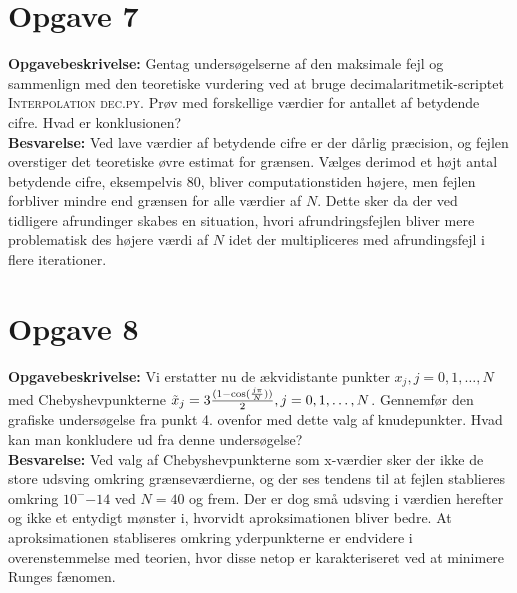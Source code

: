 \section*{Opgave 7}
\textbf{Opgavebeskrivelse:} Gentag undersøgelserne af den maksimale fejl og sammenlign med den teoretiske vurdering ved at bruge decimalaritmetik-scriptet \textsc{Interpolation dec.py}. 
Prøv med forskellige værdier for antallet af betydende cifre. 
Hvad er konklusionen?
\\
\textbf{Besvarelse:} 
Ved lave værdier af betydende cifre er der dårlig præcision, og fejlen overstiger det teoretiske øvre estimat for grænsen. 
Vælges derimod et højt antal betydende cifre, eksempelvis $80$, bliver computationstiden højere, men fejlen forbliver mindre end grænsen for alle værdier af $N$.
Dette sker da der ved tidligere afrundinger skabes en situation, hvori afrundringsfejlen bliver mere problematisk des højere værdi af $N$ idet der multipliceres med afrundingsfejl i flere iterationer.
\section*{Opgave 8}
\textbf{Opgavebeskrivelse:} Vi erstatter nu de ækvidistante punkter $x_j , j = 0, 1, \ldots , N$ med Chebyshevpunkterne $\Tilde{x}_j = 3 \frac{(1 -\cos(\frac{j \pi}{N}))}{2}, j = 0, 1, \ldots , N$. 
Gennemfør den grafiske undersøgelse fra punkt 4. ovenfor med dette valg af knudepunkter. 
Hvad kan man konkludere ud fra denne undersøgelse?
\\
\textbf{Besvarelse:} 
Ved valg af Chebyshevpunkterne som x-værdier sker der ikke de store udsving omkring grænseværdierne, og der ses tendens til at fejlen stablieres omkring $10^-{-14}$ ved $N=40$ og frem. 
Der er dog små udsving i værdien herefter og ikke et entydigt mønster i, hvorvidt aproksimationen bliver bedre.
At aproksimationen stabliseres omkring yderpunkterne er endvidere i overenstemmelse med teorien, hvor disse netop er karakteriseret ved at minimere Runges fænomen.
